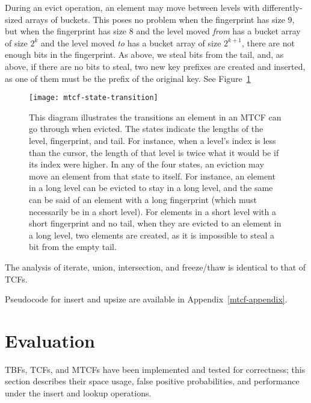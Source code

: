 \documentclass[sigconf, nonacm]{acmart}
\begin{document}
During an evict operation, an element may move between levels with differently-sized arrays of buckets.
This poses no problem when the fingerprint has size 9, but when the fingerprint has size 8 and the level moved {\em from} has a bucket array of size $2^k$ and the level moved {\em to} has a bucket array of size $2^{k+1}$, there are not enough bits in the fingerprint.
As above, we steal bits from the tail, and, as above, if there are no bits to steal, two new key prefixes are created and inserted, as one of them must be the prefix of the original key.
See Figure~\ref{mtcf-state-transition}

\begin{figure}
  \texttt{[image: mtcf-state-transition]}
\caption{\label{mtcf-state-transition}
This diagram illustrates the transitions an element in an MTCF can go through when evicted.
The states indicate the lengths of the level, fingerprint, and tail.
For instance, when a level's index is less than the cursor, the length of that level is twice what it would be if its index were higher.
In any of the four states, an eviction may move an element from that state to itself.
For instance, an element in a long level can be evicted to stay in a long level, and the same can be said of an element with a long fingerprint (which must necessarily be in a short level).
For elements in a short level with a short fingerprint and no tail, when they are evicted to an element in a long level, two elements are created, as it is impossible to steal a bit from the empty tail.
}
\end{figure}

The analysis of iterate, union, intersection, and freeze/thaw is identical to that of TCFs.

Pseudocode for insert and upsize are available in Appendix~\ref{mtcf-appendix}.


\section{Evaluation}
\label{eval}


TBFs, TCFs, and MTCFs have been implemented and tested for correctness; this section describes their space usage, false positive probabilities, and performance under the insert and lookup operations.
\end{document}

